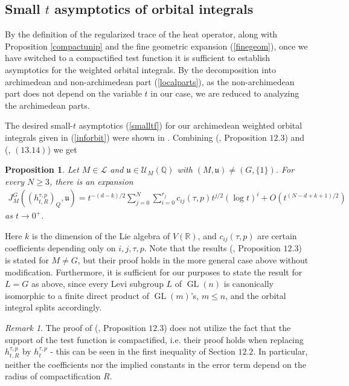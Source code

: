 \documentclass[11pt,reqno]{amsart}
\numberwithin{equation}{section}
\newtheorem{prop}[thm]{Proposition}
\theoremstyle{definition}
\theoremstyle{remark}
\newtheorem{rmk}[thm]{Remark}
\newcommand{\Q}{\mathbb{Q}}
\newcommand{\GL}{\operatorname{GL}}
\newcommand{\mf}[1]{\mathfrak{#1}}
\newcommand{\R}{\mathbb{R}}
\begin{document}
\subsection*{Small $t$ asymptotics of orbital integrals}

By the definition of the regularized trace of the heat operator, along with Proposition \ref{compactunip} and the fine geometric expansion (\ref{finegeom}), once we have switched to a compactified test function it is sufficient to establish asymptotics for the weighted orbital integrals. By the decomposition into archimedean and non-archimedean part (\ref{localparts}), as the non-archimedean part does not depend on the variable $t$ in our case, we are reduced to analyzing the archimedean parts.

The desired small-$t$ asymptotics (\ref{smalltf}) for our archimedean weighted orbital integrals given in (\ref{inforbit}) were shown in \cite{MzM1}. Combining (\cite{MzM1}, Proposition $12.3$) and (\cite{MzM1}, $(13.14)$) we get
\begin{prop}\label{orbitsmallt}
Let $M\in \mathcal{L}$ and $\mf{u}\in \mathcal{U}_M(\Q)$ with $(M,\mf{u})\neq (G,\lbrace 1\rbrace)$. For every $N\geq 3$, there is an expansion
    \begin{align*}
        J^G_M((h_{t,R}^{\tau,p})_Q,\mf{u}) = t^{-(d-k)/2}\sum_{j=0}^N\sum^{r_j}_{i=0}c_{ij}(\tau,p)t^{j/2}(\log t)^i+O(t^{(N-d+k+1)/2})
    \end{align*}
    as $t\to 0^+$.
\end{prop}
\noindent Here $k$ is the dimension of the Lie algebra of $V(\R)$, and $c_{ij}(\tau,p)$ are certain coefficients depending only on $i,j,\tau,p$. Note that the results (\cite{MzM1}, Proposition $12.3$) is stated for $M\neq G$, but their proof holds in the more general case above without modification. Furthermore, it is sufficient for our purposes to state the result for $L=G$ as above, since every Levi subgroup $L$ of $\GL(n)$ is canonically isomorphic to a finite direct product of $\GL(m)$'s, $m\leq n$, and the orbital integral splits accordingly.

\begin{rmk}\label{independentR}
    The proof of (\cite{MzM1}, Proposition $12.3$) does not utilize the fact that the support of the test function is compactified, i.e. their proof holds when replacing $h_{t,R}^{\tau,p}$ by $h_t^{\tau,p}$ - this can be seen in the first inequality of Section $12.2$. In particular, neither the coefficients nor the implied constants in the error term depend on the radius of compactification $R$. 
\end{rmk}
\end{document}

